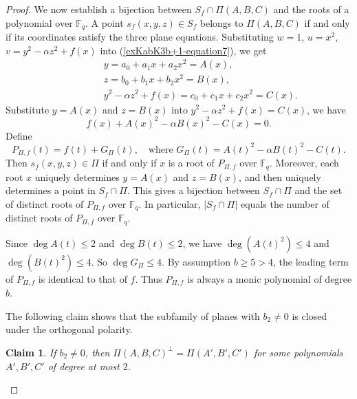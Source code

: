\documentclass[11pt,a4paper]{article}
\newtheorem{claim}{Claim}
\theoremstyle{definition}
\theoremstyle{remark}
\begin{document}
\begin{proof}
We now establish a bijection between $S_f \cap \Pi(A,B,C)$ and the roots of a polynomial over $\mathbb{F}_q$. A point $s_f(x,y,z) \in S_f$ belongs to $\Pi(A,B,C)$ if and only if its coordinates satisfy the three plane equations. Substituting $w=1$, $u=x^2$, $v = y^2 - \alpha z^2 + f(x)$ into (\ref{exKabK3b+1-equation7}), we get
\[
\begin{aligned}
~~~~~~~~~~~~~~~~~&y = a_0 + a_1 x + a_2 x^2 = A(x), \\
&z= b_0 + b_1 x + b_2 x^2 = B(x), \\
&y^2 - \alpha z^2 + f(x) = c_0 + c_1 x + c_2 x^2 = C(x).
\end{aligned}
\]
Substitute $y = A(x)$ and $z = B(x)$ into $y^2 - \alpha z^2 + f(x) = C(x)$, we have
\[
f(x) + A(x)^2 - \alpha B(x)^2 - C(x) = 0.
\]
Define %
\[
P_{\Pi,f}(t) = f(t) + G_\Pi(t), \quad \text{where } G_\Pi(t) = A(t)^2 - \alpha B(t)^2 - C(t).
\]
Then $s_f(x,y,z) \in \Pi$ if and only if $x$ is a root of $P_{\Pi,f}$ over $\mathbb{F}_q$. Moreover, each root $x$ uniquely determines $y=A(x)$ and $z=B(x)$, and then uniquely determines a point in $S_f \cap \Pi$. This gives a bijection between $S_f \cap \Pi$ and the set of distinct roots of $P_{\Pi,f}$ over $\mathbb{F}_q$. In particular, $|S_f \cap \Pi|$ equals the number of distinct roots of $P_{\Pi,f}$ over $\mathbb{F}_q$.

Since $\deg A(t) \leq 2$ and $\deg B(t) \leq 2$, we have $\deg(A(t)^2) \leq 4$ and $\deg(B(t)^2) \leq 4$. So $\deg G_\Pi \leq 4$. By assumption $b \geq 5 > 4$,  the leading term of $P_{\Pi,f}$ is identical to that of $f$. Thus $P_{\Pi,f}$ is always a monic polynomial of degree $b$.



The following claim shows that the subfamily of planes with $b_2 \neq 0$ is closed under the orthogonal polarity.

\begin{claim}\label{clm:polar-closure}
If $b_2 \neq 0$, then $\Pi(A,B,C)^\perp = \Pi(A',B',C')$ for some  polynomials $A',B',C'$ of degree at most $2$.
\end{claim}


\end{proof}
\end{document}

